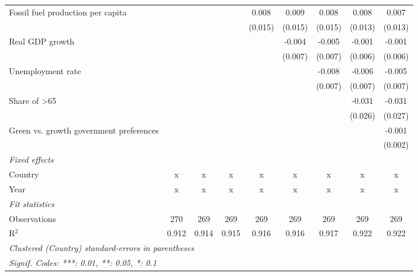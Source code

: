 \begin{table}[htbp]
\begin{tabular}{lcccccccc}
      Fossil fuel production per capita               &               &               &         & 0.008   & 0.009   & 0.008   & 0.008   & 0.007\\   
                                                      &               &               &         & (0.015) & (0.015) & (0.015) & (0.013) & (0.013)\\   
      Real GDP growth                                 &               &               &         &         & -0.004  & -0.005  & -0.001  & -0.001\\   
                                                      &               &               &         &         & (0.007) & (0.007) & (0.006) & (0.006)\\   
      Unemployment rate                               &               &               &         &         &         & -0.008  & -0.006  & -0.005\\   
                                                      &               &               &         &         &         & (0.007) & (0.007) & (0.007)\\   
      Share of >65                                    &               &               &         &         &         &         & -0.031  & -0.031\\   
                                                      &               &               &         &         &         &         & (0.026) & (0.027)\\   
      Green vs. growth government preferences         &               &               &         &         &         &         &         & -0.001\\   
                                                      &               &               &         &         &         &         &         & (0.002)\\   
      \emph{Fixed effects}\\
      Country                                         & x             & x             & x       & x       & x       & x       & x       & x\\  
      Year                                            & x             & x             & x       & x       & x       & x       & x       & x\\  
      \midrule \emph{Fit statistics}\\
      Observations                                    & 270           & 269           & 269     & 269     & 269     & 269     & 269     & 269\\  
      R$^2$                                           & 0.912         & 0.914         & 0.915   & 0.916   & 0.916   & 0.917   & 0.922   & 0.922\\  
      \midrule
      \multicolumn{9}{l}{\emph{Clustered (Country) standard-errors in parentheses}}\\
      \multicolumn{9}{l}{\emph{Signif. Codes: ***: 0.01, **: 0.05, *: 0.1}}\\
   \end{tabular}
\end{table}


